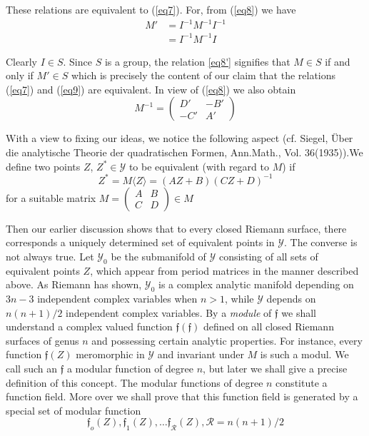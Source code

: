 These relations are equivalent to (\ref{eq7}). For, from (\ref{eq8}) we have 
\begin{align*}
M' & = I^{-1} M^{-1} I^{-1}\\
& = I^{-1}M^{-1}I \tag*{$(8)'$}\label{eq8'}
\end{align*}

Clearly $I   \in   S$. Since $S$ is a group, the relation \ref{eq8'}
signifies that $M   \in   S$ if and only if $M'   \in   S$ which is
precisely the content of our claim that the relations (\ref{eq7}) and
(\ref{eq9}) are equivalent. In view of (\ref{eq8}) we also obtain 
\begin{equation*}
M^{-1} = 
\begin{pmatrix}
 D' & -B' \\ 
-C' & A'  
\end{pmatrix} \tag{10}\label{eq10}
\end{equation*}

With a view to fixing our ideas, we notice the following aspect
(cf. Siegel, \"Uber die analytische Theorie der quadratischen Formen,
Ann.Math., Vol. 36(1935)).\pageoriginale We define two points $Z$, $Z^* \in
\mathscr{Y}$ to be equivalent (with regard to $M$) if  
\begin{equation*}
Z^* = M \langle Z \rangle = (AZ + B) (CZ + D)^{-1} \tag{11}\label{eq11}
\end{equation*}
for a suitable matrix $M = \begin{pmatrix} A & B \\ C &
  D \end{pmatrix} \in M$

Then our earlier discussion shows that to every closed Riemann
surface, there corresponds a uniquely determined set of equivalent
points in $\mathscr{Y}$. The converse is not always true. Let
$\mathscr{Y}_0$ be the submanifold of $\mathscr{Y}$ consisting of all
sets of equivalent points $Z$, which appear from period matrices in
the manner described above. As Riemann has shown, $\mathscr{Y}_0$ is a
complex analytic manifold depending on $3   n - 3 $ independent
complex variables when $n > 1$, while $\mathscr{Y}$ depends on
$n(n+1)/2$ independent complex variables. By a \textit{module} of
$\mathfrak{f}$ we shall understand a complex valued function
$\mathfrak{f}(\mathfrak{f})$ defined on all closed Riemann surfaces of
genus $n$ and possessing certain analytic properties. For instance,
every function $\mathfrak{f}(Z)$ meromorphic in $\mathscr{Y}$ and
invariant under $M$ is such a modul. We call such an $\mathfrak{f}$ a
modular function of degree $n$, but later we shall give a precise
definition of this concept. The modular functions of degree $n$
constitute a function field. More over we shall prove that this
function field is generated by a special set of modular function 
\begin{equation*}
\mathfrak{f}_o (Z),\mathfrak{f}_1(Z),\ldots
\mathfrak{f}_{\mathscr{R}}(Z),\mathscr{R} = n(n+1)/2 \tag{12}\label{eq12} 
\end{equation*}


